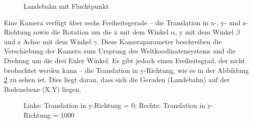 \documentclass{ezb}
\begin{document}
\begin{figure}[htbp]
	\centering
	\caption{Landebahn mit Fluchtpunkt}
	\label{landebahnAufgBild}
\end{figure}

Eine Kamera verfügt über sechs Freiheitsgerade – die Translation in x-, y- und z-Richtung sowie die Rotation um die x mit dem Winkel $\alpha$, y mit dem Winkel $\beta$ und z Achse mit dem Winkel $\gamma$. Diese Kameraparameter beschreiben die Verschiebung  der Kamera zum Ursprung des Weltkoodinatensystems und die Drehung um die drei Euler Winkel. Es gibt jedoch einen Freiheitsgrad, der nicht beobachtet werden kann – die Translation in y-Richtung, wie es in der Abbildung \ref{yTranslation} zu sehen ist. Dies liegt daran, dass sich die Geraden (Landebahn) auf der Bodenebene (X,Y) liegen.

\begin{figure}[htbp]
	\centering
	\caption{Links: Translation in y-Richtung = 0; Rechts: Translation in y-Richtung = 1000}
	\label{yTranslation}
\end{figure}
\end{document}
